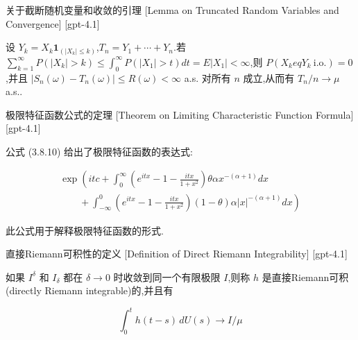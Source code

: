 \documentclass[UTF8]{ctexart}
\begin{document}
    
    
    \begin{lma}
        {关于截断随机变量和收敛的引理}
        [Lemma on Truncated Random Variables and Convergence]
        [gpt-4.1]
        
设 $Y_{k} = X_{k} \boldsymbol{1}_{(|X_{k}| \leq k)}$,$T_{n} = Y_{1} + \cdots + Y_{n}$.若 $\sum_{k=1}^{\infty} P(|X_{k}| > k) \leq \int_{0}^{\infty} P(|X_{1}| > t) dt = E|X_{1}| < \infty$,则 $P(X_{k} 
eq Y_{k}\ \mathrm{i.o.}) = 0$,并且 $|S_{n}(\omega) - T_{n}(\omega)| \leq R(\omega) < \infty$ a.s. 对所有 $n$ 成立,从而有 $T_{n}/n \to \mu$ a.s..

    \end{lma}
    
    
    
    \begin{thm}
        {极限特征函数公式的定理}
        [Theorem on Limiting Characteristic Function Formula]
        [gpt-4.1]
        
公式 (3.8.10) 给出了极限特征函数的表达式:

\[
\begin{array}{l}
{\displaystyle \exp \left( i t c + \int_{0}^{\infty} \left( e^{i t x} - 1 - \frac{i t x}{1 + x^{2}} \right) \theta \alpha x^{-(\alpha + 1)} dx \right.} \\
{\displaystyle \qquad + \left.\int_{-\infty}^{0} \left( e^{i t x} - 1 - \frac{i t x}{1 + x^{2}} \right) (1 - \theta) \alpha |x|^{-(\alpha + 1)} dx \right) }
\end{array}
\]

此公式用于解释极限特征函数的形式.

    \end{thm}
    
    
    
    \begin{dfn}
        {直接Riemann可积性的定义}
        [Definition of Direct Riemann Integrability]
        [gpt-4.1]
        
如果 $I^{\delta}$ 和 $I_{\delta}$ 都在 $\delta \to 0$ 时收敛到同一个有限极限 $I$,则称 $h$ 是直接Riemann可积(directly Riemann integrable)的,并且有

\[
\int_{0}^{t} h(t-s)\, dU(s) \to I/\mu
\]

    \end{dfn}
    
\end{document}
